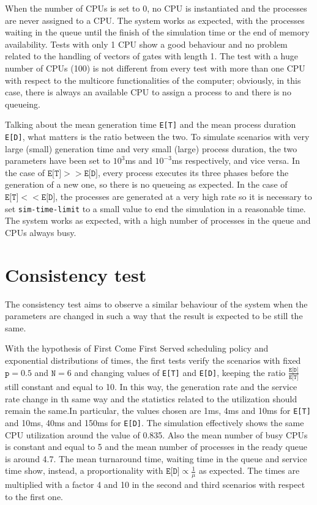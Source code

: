 When the number of CPUs is set to 0, no CPU is instantiated and the processes
are never assigned to a CPU. The system works as expected, with the processes
waiting in the queue until the finish of the simulation time or the end of
memory availability. Tests with only 1 CPU show a good behaviour and no problem
related to the handling of vectors of gates with length 1. The test with
a huge number of CPUs (100) is not different from every test with more than 
one CPU with respect to the multicore functionalities of the computer; obviously,
in this case, there is always an available CPU to assign a process to and 
there is no queueing.

Talking about the mean generation time \texttt{E[T]} and the mean process duration 
\texttt{E[D]}, what matters is the ratio between the two. To simulate scenarios
with very large (small) generation time and very small (large) process duration, the two
parameters have been set to $10^3$ms and $10^{-3}$ms respectively, and vice versa.
In the case of $\texttt{E[T]}>>\texttt{E[D]}$, every process executes its three phases 
before the generation of a new one, so there is no queueing as expected.
In the case of $\texttt{E[T]}<<\texttt{E[D]}$, the processes are generated at a very high rate
so it is necessary to set \texttt{sim-time-limit} to a small value to 
end the simulation in a reasonable time. The system works as expected, with
a high number of processes in the queue and CPUs always busy.

\section{Consistency test}
The consistency test aims to observe a similar behaviour of the system when the
parameters are changed in such a way that the result is expected to be still the same.

With the hypothesis of First Come First Served scheduling policy and 
exponential distributions of times, the first tests verify the scenarios 
with fixed $\texttt{p}=0.5$ and $\texttt{N}=6$ and changing values of \texttt{E[T]} and \texttt{E[D]}, 
keeping the ratio $\frac{\texttt{E[D]}}{\texttt{E[T]}}$ still constant and equal to 10. In this way, the generation
rate and the service rate change in th same way and the statistics related to
the utilization should remain the same.In particular, the values chosen are 1ms, 
4ms and 10ms for \texttt{E[T]} and 10ms, 40ms and 150ms for \texttt{E[D]}. 
The simulation effectively shows the same CPU utilization around the value of
0.835. Also the mean number of busy CPUs is constant and equal to 5 and the mean
number of processes in the ready queue is around 4.7. The mean turnaround time, 
waiting time in the queue and service time show, instead, a proportionality
with $\texttt{E[D]}\propto \frac{1}{\mu}$ as expected. The times are multiplied 
with a factor 4 and 10 in the second and third scenarios with respect to the first one.

